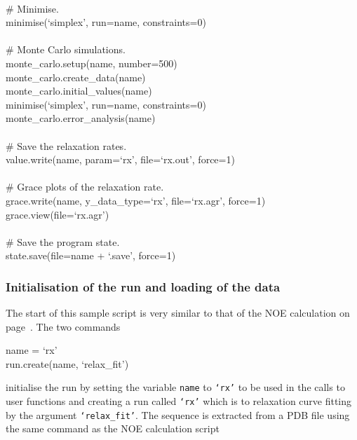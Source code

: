 \begin{exampleenv}
 \\
\# Minimise. \\
minimise(`simplex', run=name, constraints=0) \\
 \\
\# Monte Carlo simulations. \\
monte\_carlo.setup(name, number=500) \\
monte\_carlo.create\_data(name) \\
monte\_carlo.initial\_values(name) \\
minimise(`simplex', run=name, constraints=0) \\
monte\_carlo.error\_analysis(name) \\
 \\
\# Save the relaxation rates. \\
value.write(name, param=`rx', file=`rx.out', force=1) \\
 \\
\# Grace plots of the relaxation rate. \\
grace.write(name, y\_data\_type=`rx', file=`rx.agr', force=1) \\
grace.view(file=`rx.agr') \\
 \\
\# Save the program state. \\
state.save(file=name + `.save', force=1)
\end{exampleenv}


\subsubsection{Initialisation of the run and loading of the data}

The start of this sample script is very similar to that of the NOE calculation on page~\pageref{NOE initialisation}.  The two commands

\begin{exampleenv}
name = `rx' \\
run.create(name, `relax\_fit')
\end{exampleenv}

initialise the run by setting the variable \texttt{name} to \texttt{`rx'} to be used in the calls to user functions and creating a run called \texttt{`rx'} which is to relaxation curve fitting by the argument \texttt{`relax\_fit'}.  The sequence is extracted from a PDB file using the same command as the NOE calculation script


